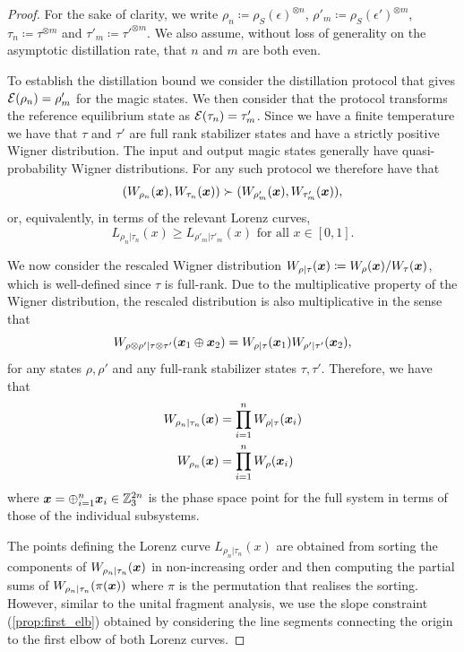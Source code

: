 \documentclass[pra,
aps,
twocolumn,
superscriptaddress,
groupedaddress,
nofootinbib,
reprint
]{revtex4-1}
\begin{document}
\begin{proof}	\label{thm:free-energy-bound-proof}
For the sake of clarity, we write $\rho_n \coloneqq \rho_S(\epsilon)^{\otimes n}$, $\rho'_m \coloneqq \rho_S(\epsilon')^{\otimes m}$, $\tau_n \coloneqq \tau^{\otimes m}$ and $\tau'_m \coloneqq \tau'^{\otimes m}$.  We also assume, without loss of generality on the asymptotic distillation rate, that $n$ and $m$ are both even.

To establish the distillation bound we consider the distillation protocol that gives ${\mathcal E}( \rho_n) = \rho'_m$ for the magic states. 
We then consider that the protocol transforms the reference equilibrium state as ${\mathcal E}( \tau_n) = \tau'_m$.
Since we have a finite temperature we have that $\tau$ and $\tau'$ are full rank stabilizer states and have a strictly positive Wigner distribution. The input and output magic states generally have quasi-probability Wigner distributions. 
For any such protocol we therefore have that
\begin{equation}
	( W_{\rho_n}(\bm{x}), W_{\tau_n}(\bm{x}) ) \succ ( W_{\rho'_m}(\bm{x}), W_{\tau'_m}(\bm{x}) ),
\end{equation}
or, equivalently, in terms of the relevant Lorenz curves,
\begin{equation}
	L_{\rho_n |\tau_n}(x) \ge L_{\rho'_m |\tau'_m}(x) \mbox{ for all } x \in [0,1].
\end{equation}

We now consider the rescaled Wigner distribution $W_{\rho | \tau}(\boldsymbol{x}) \coloneqq W_\rho(\boldsymbol{x})/W_\tau(\boldsymbol{x})$, which is well-defined since $\tau$ is full-rank. 
Due to the multiplicative property of the Wigner distribution, the rescaled distribution is also multiplicative in the sense that
\begin{equation}
	W_{\rho \otimes \rho' | \tau \otimes \tau'} (\boldsymbol{x}_1 \oplus \boldsymbol{x}_2) = W_{\rho | \tau}(\boldsymbol{x}_1)W_{\rho' | \tau'}(\boldsymbol{x}_2),
\end{equation}
for any states $\rho, \rho'$ and any full-rank stabilizer states $\tau, \tau'$.
Therefore, we have that
\begin{align}
	W_{\rho_n |\tau_n} (\boldsymbol{x}) &= \prod_{i=1}^n W_{\rho|\tau}(\boldsymbol{x}_i)\\
	W_{\rho_n } (\boldsymbol{x}) &= \prod_{i=1}^n W_\rho(\boldsymbol{x}_i)
\end{align}
where $\boldsymbol{x} = \oplus_{i=1}^n \boldsymbol{x}_i \in \mathbb{Z}_3^{2n}$ is the phase space point for the full system in terms of those of the individual subsystems.

The points defining the Lorenz curve $L_{\rho_n |\tau_n}(x)$ are obtained from sorting the components of $W_{\rho_n |\tau_n}(\boldsymbol{x})$ in non-increasing order and then computing the partial sums of $W_{\rho_n |\tau_n}(\pi(\boldsymbol{x}))$ where $\pi$ is the permutation that realises the sorting. 
However, similar to the unital fragment analysis, we use the slope constraint (\cref{prop:first_elb}) obtained by considering the line segments connecting the origin to the first elbow of both Lorenz curves.


\end{proof}
\end{document}
